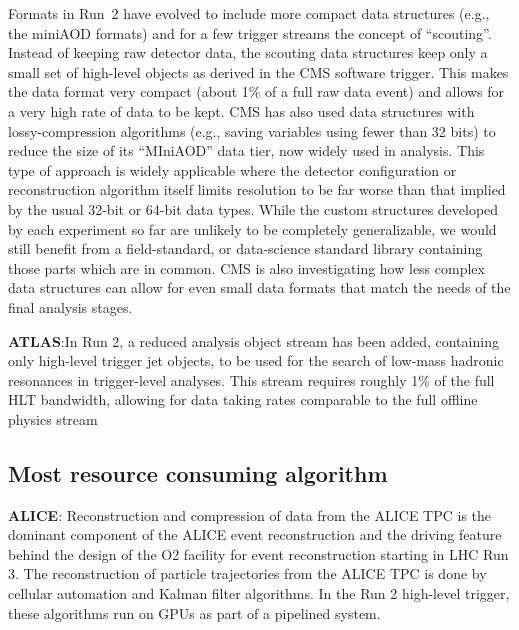 Formats in Run~2 have evolved to include more compact data structures (e.g., the miniAOD formats) and for a few trigger streams the concept of ``scouting''. Instead of keeping raw detector data, 
the scouting data structures keep only a small set of high-level objects as derived in the CMS software trigger. This makes the data format very compact (about 1\% of a full raw data event) 
and allows for a very high rate of data to be kept. CMS has also used data structures with lossy-compression algorithms (e.g., saving variables using fewer than 32 bits) to reduce the size of 
its ``MIniAOD'' data tier, now widely used in analysis. This type of approach is widely applicable where the detector configuration or reconstruction algorithm itself limits resolution 
to be far worse than that implied by the usual 32-bit or 64-bit data types. While the custom structures developed by each experiment so far are unlikely to be completely generalizable, 
we would still benefit from a field-standard, or data-science standard library containing those parts which are in common.  CMS is also investigating how less complex data structures 
can allow for even small data formats that match the needs of the final analysis stages.

\vskip 0.5cm
\noindent
{\bf ATLAS}:In Run 2, a reduced analysis object stream has been added, containing only high-level trigger jet objects, to be 
used for the search of low-mass hadronic resonances in trigger-level analyses. This stream requires roughly 1\% of the full HLT bandwidth, allowing for data taking rates comparable to the 
full offline physics stream \cite{ATLASTwiki} 

\subsection{Most resource consuming algorithm}
{\bf ALICE}: Reconstruction and compression of data from the ALICE TPC is the dominant component of the ALICE event reconstruction and the driving feature behind the design of the O2 
facility \cite{ALICE2015} for event reconstruction starting in LHC Run 3. The reconstruction of particle trajectories from the ALICE TPC is done by cellular automation and Kalman filter algorithms. 
In the Run 2 high-level trigger, these algorithms run on GPUs as part of a pipelined system.

